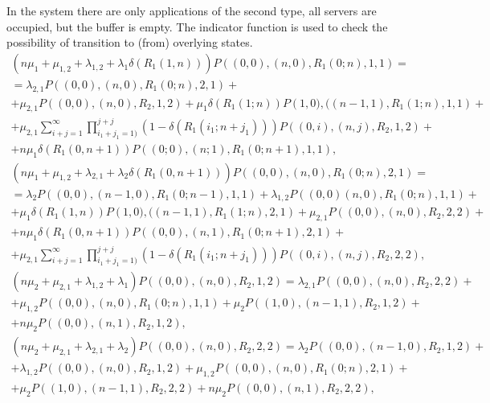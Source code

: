 {In the system there are only applications of the second type, all
servers are occupied, but the buffer is empty. The indicator function
is used to check the possibility of transition to (from) overlying
states.
\begin{multline}
  \left(n\mu_1+\mu_{1,2}+\lambda_{1,2}+\lambda_1 \delta\left(R_1
      (1,n)\right)\right) P\left((0,0),(n,0),R_1 (0;n),1,1\right) = \\
  = \lambda_{2,1} P\left((0,0),(n,0),R_1 (0;n),2,1\right)+ \\ +
  \mu_{2,1} P\left((0,0),(n,0),R_2,1,2\right)+\mu_1 \delta\left(R_1
    (1;n)\right) P\left(1,0),((n-1,1),R_1 (1;n),1,1\right)+\\ +
  \mu_{2,1}
  \sum\limits_{i+j=1}^{\infty}\prod\limits_{i_1+j_1=1)}^{j+j}\left(1-\delta\left(R_1
      (i_1;n+j_1) \right)\right) P\left((0,i),(n,j),R_2,1,2\right)+ \\
  + n\mu_1 \delta\left(R_1 (0,n+1)\right) P\left((0;0),(n;1),R_1
    (0;n+1),1,1\right),
\label{eq:6.1}
\end{multline}
\begin{multline}
  \left(n\mu_1+\mu_{1,2}+\lambda_{2,1}+\lambda_2 \delta\left(R_1
      (0,n+1)\right)\right) P\left((0,0),(n,0),R_1 (0;n),2,1\right) =
  \\ = \lambda_2 P\left((0,0),(n-1,0),R_1 (0;n-1),1,1\right)+
  \lambda_{1,2} P\left((0,0)(n,0),R_1 (0;n),1,1\right)+ \\ + \mu_1
  \delta\left(R_1 (1,n)\right) P\left(1,0),((n-1,1),R_1
    (1;n),2,1\right)+\mu_{2,1} P\left((0,0),(n,0),R_2,2,2\right)+\\ +
  n\mu_1 \delta\left(R_1 (0,n+1)\right) P\left((0,0),(n,1), R_1
    (0;n+1),2,1\right)+ \\ + \mu_{2,1}
  \sum\limits_{i+j=1}^{\infty}\prod\limits_{i_1+j_1=1)}^{j+j}\left(1-\delta\left(R_1
      (i_1;n+j_1) \right)\right) P\left((0,i),(n,j),R_2,2,2\right),
\label{eq:6.2}
\end{multline}
\begin{multline}
  \left(n\mu_2+\mu_{2,1}+\lambda_{1,2}+\lambda_1 \right)
  P\left((0,0),(n,0),R_2,1,2\right) = \lambda_{2,1}
  P\left((0,0),(n,0),R_2,2,2\right)+ \\ +
  \mu_{1,2} P\left((0,0),(n,0), R_1(0;n),1,1\right)+ \mu_2
  P\left((1,0),(n-1,1),R_2,1,2\right)+ \\ +
  n\mu_2 P\left((0,0),(n,1), R_2,1,2\right),
\label{eq:6.3}
\end{multline}
\begin{multline}
  \left(n\mu_2+\mu_{2,1}+\lambda_{2,1}+\lambda_2\right)
  P\left((0,0),(n,0),R_2,2,2\right) = \lambda_2
  P\left((0,0),(n-1,0),R_2,1,2\right)+\\ + \lambda_{1,2}
  P\left((0,0),(n,0),R_2,1,2\right)+ \mu_{1,2}
  P\left((0,0),(n,0),R_1(0;n),2,1\right)+\\ + \mu_2
  P\left((1,0),(n-1,1),R_2,2,2\right)+ n\mu_2 P\left((0,0),(n,1),
    R_2,2,2\right),
\label{eq:6.4}
\end{multline}

}
